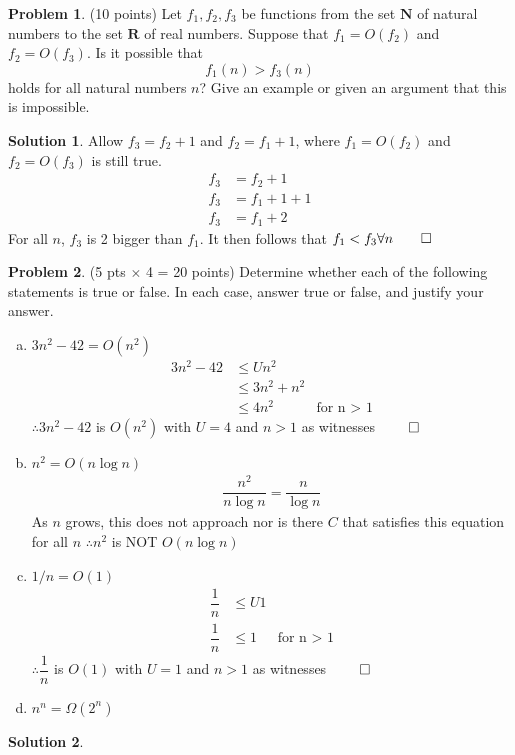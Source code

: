 \documentclass{article}
\theoremstyle{definition}
\newtheorem{problem}{Problem}
\newtheorem*{solution}{Solution}
\newcommand{\N}{\mathbf{N}}
\newcommand{\R}{\mathbf{R}}
\begin{document}
\begin{problem} (10 points) 
Let $f_1, f_2, f_3$ be functions from the set $\N$ of natural numbers
to the set $\R$ of real numbers. Suppose that $f_1= O(f_2)$ and
$f_2=O(f_3)$. Is it possible that 
$$ f_1(n) > f_3(n)$$ 
holds for all natural numbers $n$? Give an example or given an argument that this
is impossible. 
\end{problem}
\begin{solution}
Allow $f_3 = f_2 +1$ and $f_2 = f_1 +1$, where $f_1 = O(f_2)$ and $f_2 = O(f_3)$ is still true.
\begin{align*}
  f_3 &= f_2 +1 \\
  f_3 &= f_1 + 1 + 1 \\
  f_3 &= f_1 +2
\end{align*}
For all $n$, $f_3$ is 2 bigger than $f_1$. It then follows that $f_1 < f_3 \forall n \qed$
\end{solution}

\begin{problem} (5 pts $\times$ 4 = 20 points) 
Determine whether each of the following statements is true or false.
In each case, answer true or false, and justify your answer.
\begin{enumerate}[a)]
\item $3n^2-42 = O(n^2)$
\begin{align*}
  3n^2-42 &\le U n^{2} \\
  &\le 3n^{2} + n^{2} \\
  &\le 4 n^{2} &\text{for n $>$ 1}
\end{align*}
$\therefore 3n^2-42$ is $O(n^{2})$ with $U = 4$ and $n > 1$ as witnesses $\qed$

\item $n^2 = O(n\log n)$
\begin{align*}
  \dfrac{n^2}{n\log n} = \dfrac{n}{\log n}
\end{align*}
As $n$ grows, this does not approach nor is there $C$ that satisfies this equation for all $n$
$\therefore n^2$ is NOT $O(n\log n)$

\item $1/n = O(1)$
\begin{align*}
  \dfrac{1}{n} &\le U 1 \\
  \dfrac{1}{n} &\le 1 &\text{for n $>$ 1}
\end{align*}
$\therefore \dfrac{1}{n}$ is $O(1)$ with $U = 1$ and $n > 1$ as witnesses $\qed$

\item $n^n = \Omega(2^n)$
\end{enumerate}
\end{problem}
\begin{solution}
\end{solution}
\end{document}
